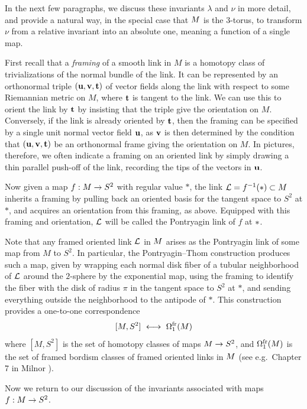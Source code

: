 In the next few paragraphs, we discuss these invariants $\lambda$ and $\nu$ in more detail, and provide a natural way, in the special case that $M$ is the $3$-torus, to transform $\nu$ from a relative invariant into an absolute one, meaning a function of a single map.

First recall that a {\it framing} of a smooth link in $M$ is a homotopy class of trivializations of the normal bundle of the link. It can be represented by an orthonormal triple $(\textup{\bf u},\textup{\bf v},\textup{\bf t})$ of vector fields along the link with respect to some Riemannian metric on $M$, where $\textup{\bf t}$ is tangent to the link.  We can use this to orient the link by $\textup{\bf t}$ by insisting that the triple give the orientation on $M$.  Conversely, if the link is already oriented by $\textup{\bf t}$, then the framing can be specified by a single unit normal vector field $\textup{\bf u}$, as $\textup{\bf v}$ is then determined by the condition that $(\textup{\bf u},\textup{\bf v},\textup{\bf t})$ be an orthonormal frame giving the orientation on $M$.  In pictures, therefore, we often indicate a framing on an oriented link by simply drawing a thin parallel push-off of the link, recording the tips of the vectors in $\textup{\bf u}$.

Now given a map $f:M\to S^2$ with regular value $*$, the link $\mathcal L = f^{-1}(*)\subset M$ inherits a framing by pulling back an oriented basis for the tangent space to $S^2$ at $*$, and acquires an orientation from this framing, as above.   Equipped with this framing and orientation, $\mathcal L$ will be called the {\itb Pontryagin link} of $f$ at $\mathrm{*}$.  

Note that any framed oriented link $\mathcal L$ in $M$ arises as the Pontryagin link of some map from $M$ to $S^2$.  In particular, the {\itb Pontryagin--Thom construction} produces such a map, given by wrapping each normal disk fiber of a tubular neighborhood of $\mathcal L$ around the $2$-sphere by the exponential map, using the framing to identify the fiber with the disk of radius $\pi$ in the tangent space to $S^2$ at $*$, and sending everything outside the neighborhood to the antipode of $*$.  This construction provides a one-to-one correspondence 
$$
[M,S^2] \ \longleftrightarrow \ \Omega_1^{\text{fr}}(\man)
$$
where $[M,S^2]$ is the set of homotopy classes of maps $M\to S^2$, and $\Omega_1^{\text{fr}}(M)$ is the set of framed bordism classes of framed oriented links in $M$  (see e.g.\ Chapter 7 in Milnor \cite{Milnor65}).  

Now we return to our discussion of the invariants associated with maps $f:M\to S^2$.  

